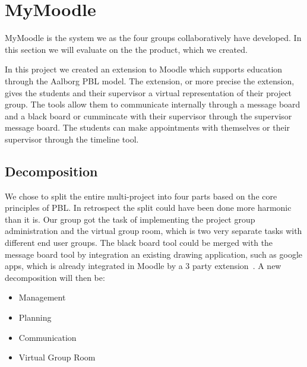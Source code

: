 \section{MyMoodle}
MyMoodle is the system we as the four groups collaboratively have developed.
In this section we will evaluate on the the product, which we created.


In this project we created an extension to Moodle which supports education through the Aalborg PBL model. 
The extension, or more precise the extension, gives the students and their supervisor a virtual representation of their project group. 
The tools allow them to communicate internally through a message board and a black board or cummincate with their supervisor through the supervisor message board.
The students can make appointments with themselves or  their supervisor through the timeline tool.


\subsection{Decomposition}
We chose to split the entire multi-project into four parts based on the core principles of PBL. 
In retrospect the split could have been done more harmonic than it is.
Our group got the task of implementing the project group administration and the virtual group room, which is two very separate tasks with different end user groups. 
The black board tool could be merged with the message board tool by integration an existing drawing application, such as google apps, which is already integrated in Moodle by a 3\rds{} party extension~\cite{moodlegoogleapp}. 
A new decomposition will then be:
\begin{itemize}
	\item Management
	\item Planning
	\item Communication
	\item Virtual Group Room
\end{itemize}


